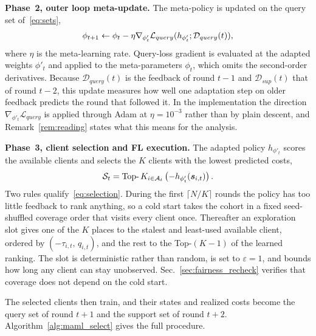 \documentclass[journal]{IEEEtran}
\theoremstyle{remark}
\newcommand{\revision}[1]{#1}
\newcommand{\revtwo}[1]{#1}
\begin{document}
\textbf{Phase~2\revtwo{, outer loop meta-update}.}
\revision{%
The meta-policy is updated on \revtwo{the query set of~\eqref{eq:sets}},}
\begin{equation}
		\color{black}
		\phi_{t+1} \leftarrow \phi_t - \eta \nabla_{\phi'_t} \mathcal{L}_{query}(h_{\phi'_t}; \mathcal{D}_{query}(t)),
		\label{eq:outer_loop}
\end{equation}
\revision{where $\eta$ is the meta-learning rate. %
Query-loss gradient is evaluated at the adapted weights $\phi'_t$ and applied to the meta-parameters $\phi_t$, which omits the second-order derivatives.} \revtwo{Because $\mathcal{D}_{query}(t)$ is the feedback of round $t-1$ and $\mathcal{D}_{sup}(t)$ that of round $t-2$, this update measures how well one adaptation step on older feedback predicts the round that followed it. In the implementation the direction $\nabla_{\phi'_t}\mathcal{L}_{query}$ is applied through Adam at $\eta=10^{-3}$ rather than by plain descent, and Remark~\ref{rem:reading} states what this means for the analysis.}

\textbf{Phase~3\revtwo{, client selection and FL execution}.}
\revision{The adapted policy $h_{\phi'_t}$ scores the available clients and selects the $K$ clients with the lowest predicted costs,}
\begin{equation}
	\color{black}
	\mathcal{S}_t = \operatorname{Top-}K_{i \in \mathcal{A}_t} \left( -h_{\phi'_t}(\bm{s}_{i,t}) \right).
	\label{eq:selection}
\end{equation}
\revtwo{Two rules qualify~\eqref{eq:selection}. During the first $\lceil N/K\rceil$ rounds the policy has too little feedback to rank anything, so a cold start takes the cohort in a fixed seed-shuffled coverage order that visits every client once. Thereafter an exploration slot gives one of the $K$ places to the stalest and least-used available client, ordered by $(-\tau_{i,t},\,q_{i,t})$, and the rest to the Top-$(K-1)$ of the learned ranking. The slot is deterministic rather than random, is set to $\varepsilon=1$, and bounds how long any client can stay unobserved. Sec.~\ref{sec:fairness_recheck} verifies that coverage does not depend on the cold start.}

\revision{The selected clients then train, and their states and realized costs become the query set of round $t+1$ and the support set of round $t+2$. Algorithm~\ref{alg:maml_select} gives the full procedure.}
\end{document}
